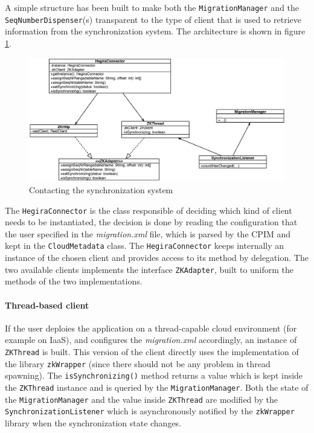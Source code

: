 \newparagraph A simple structure has been built to make both the \texttt{MigrationManager} and the \texttt{SeqNumberDispenser}(s) transparent to the type of client that is used to retrieve information from the synchronization system. The architecture is shown in figure \ref{fig:zk-adapter}.

\begin{figure}[tbh]
  \centering
  \includegraphics[width=14cm]{images/zk_adapter}
  \caption{Contacting the synchronization system}
  \label{fig:zk-adapter}
\end{figure} 

\noindent The \texttt{HegiraConnector} is the class responsible of deciding which kind of client needs to be instantiated, the decision is done by reading the configuration that the user specified in the \textit{migration.xml} file, which is parsed by the CPIM and kept in the \texttt{CloudMetadata} class. The \texttt{HegiraConnector}  keeps internally an instance of the chosen client and provides access to its method by delegation.
The two available clients implements the interface \texttt{ZKAdapter}, built to uniform the methods of the two implementations.

\paragraph{Thread-based client} If the user deploies the application on a thread-capable cloud environment (for example on IaaS), and configures the \textit{migration.xml} accordingly, an instance of \texttt{ZKThread} is built. This version of the client directly uses the implementation of the library \texttt{zkWrapper} (since there should not be any problem in thread spawning).
The \texttt{isSynchronizing()} method returns a value which is kept inside the \texttt{ZKThread} instance and is queried by the \texttt{MigrationManager}.
Both the state of the \texttt{MigrationManager} and the value inside \texttt{ZKThread} are modified by the \texttt{SynchronizationListener} which is asynchronously notified by the \texttt{zkWrapper} library when the synchronization state changes.

